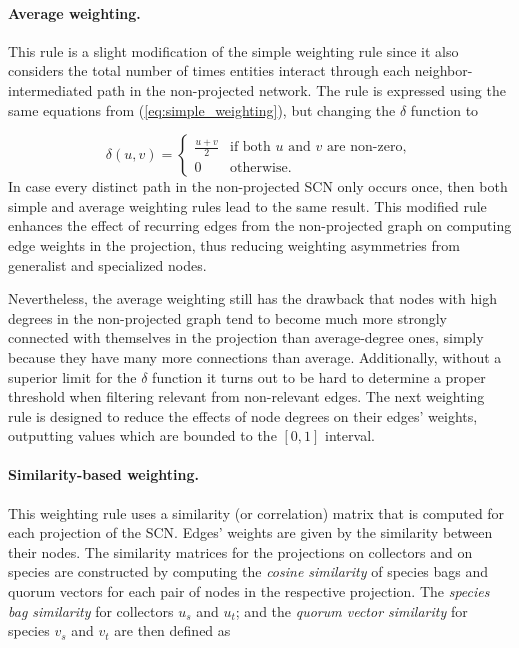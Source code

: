 {\paragraph*{Average weighting.}
This rule is a slight modification of the simple weighting rule since it also considers the total number of times entities interact through each neighbor-intermediated path in the non-projected network. The rule is expressed using the same equations from (\ref{eq:simple_weighting}), but changing the $\delta$ function to
 
$$\delta(u,v) = 
\begin{cases}
\frac{u+v}{2} &  \mbox{if both } u \mbox{ and } v \mbox{ are non-zero},\\
0 & \mbox{otherwise}.
\end{cases}
$$
In case every distinct path in the non-projected SCN only occurs once, then both simple and average weighting rules lead to the same result. %
This modified rule enhances the effect of recurring edges from the non-projected graph on computing edge weights in the projection, thus reducing weighting asymmetries from generalist and specialized nodes.

Nevertheless, the average weighting still has the drawback that nodes with high degrees in the non-projected graph tend to become much more strongly connected with themselves in the projection than average-degree ones, simply because they have many more connections than average.
Additionally, without a superior limit for the $\delta$ function it turns out to be hard to determine a proper threshold when filtering relevant from non-relevant edges. The next weighting rule is designed to reduce the effects of node degrees on their edges' weights, outputting values which are bounded to the $[0,1]$ interval.


\paragraph*{Similarity-based weighting.}
This weighting rule uses a similarity (or correlation) matrix that is computed for each projection of the SCN. Edges' weights are given by the similarity between their nodes. The similarity matrices for the projections on collectors and on species are constructed by computing the  \textit{cosine similarity} of species bags and quorum vectors for each pair of nodes in the respective projection. 
The \textit{species bag similarity} for collectors $u_s$ and $u_t$; and the \textit{quorum vector similarity} for species $v_s$ and $v_t$ are then defined as

}
